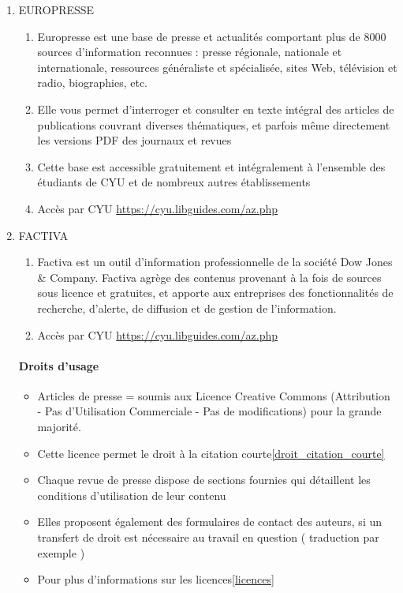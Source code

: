 \documentclass{book}
\newenvironment{titlemize}[1]{%
  \paragraph{#1}
  \begin{itemize}}
  {\end{itemize}}
\begin{document}
\begin{enumerate}
	\item EUROPRESSE 
        \begin{enumerate}
            \item Europresse est une base de presse et actualités comportant plus de 8000 sources d’information reconnues : presse régionale, nationale et internationale, ressources généraliste et spécialisée, sites Web, télévision et radio, biographies, etc.
            \item Elle vous permet d’interroger et consulter en texte intégral des articles de publications couvrant diverses thématiques, et parfois même directement les versions PDF des journaux et revues
            \item Cette base est accessible gratuitement et intégralement à l'ensemble des étudiants de CYU et de nombreux autres établissements
            \item Accès par CYU \url{https://cyu.libguides.com/az.php}
        \end{enumerate}
    \item FACTIVA
    \begin{enumerate}
        \item Factiva est un outil d'information professionnelle de la société Dow Jones \& Company. Factiva agrège des contenus provenant à la fois de sources sous licence et gratuites, et apporte aux entreprises des fonctionnalités de recherche, d'alerte, de diffusion et de gestion de l'information.
        \item Accès par CYU \url{https://cyu.libguides.com/az.php}
    \end{enumerate}
    \begin{titlemize}{Droits d'usage}
        \item Articles de presse =  soumis aux Licence Creative Commons (Attribution - Pas d’Utilisation Commerciale - Pas de modifications) pour la grande majorité.
        \item Cette licence permet le droit à la citation courte\ref{droit_citation_courte} 
        \item Chaque revue de presse dispose de sections fournies qui détaillent les conditions d'utilisation de leur contenu
        \item Elles proposent également des formulaires de contact des auteurs, si un transfert de droit est nécessaire au travail en question ( traduction par exemple ) 
        \item Pour plus d'informations sur les licences\ref{licences}
        
    \end{titlemize}

	      		      	      		   
\end{enumerate}
    
\end{document}
